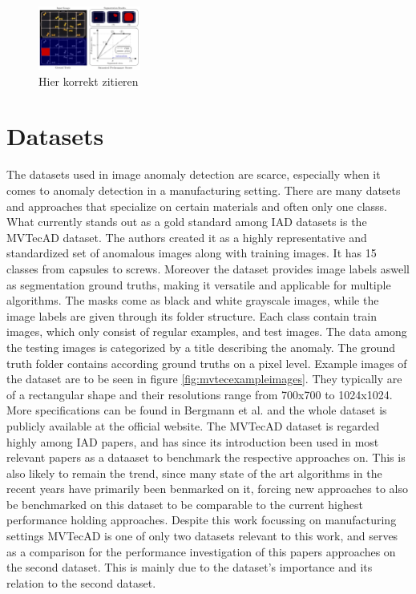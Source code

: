 \begin{figure}[ht]
    \centering
    \includegraphics[width=0.3\textwidth]{figures/spro_vs_pro_bergmann.png}
    \caption{Hier korrekt zitieren}
    \label{fig:sprovspro}
\end{figure}



\section{Datasets}
\label{sec:datasets}
The datasets used in image anomaly detection are scarce, especially when it comes to anomaly detection in a manufacturing setting. There are many datsets and approaches that specialize on certain materials \cite{FabricDataset_Tsang_2016} 
\cite{SteeltubeDataset_Yang_2021} \cite{magnetictiles_Huang_2018}
and often only one classs. What currently stands out as a gold standard among IAD datasets is the MVTecAD \cite{MVTEC_Bergmann_2021} dataset. The authors created it  
as a highly representative and standardized set of anomalous images along with training images. It has 15 classes from capsules to screws. Moreover the dataset provides image labels aswell as segmentation 
ground truths, making it versatile and applicable for multiple algorithms. The masks come as black and white grayscale images, while the image labels are given through its folder structure. 
Each class contain train images, which only consist of regular examples, 
and test images. The data among the testing images is categorized by a title describing the anomaly. The ground truth folder contains 
according ground truths on a pixel level.\newline
Example images of the dataset are to be seen in figure \ref{fig:mvtecexampleimages}. They typically are of a rectangular shape and their resolutions range from 
700x700 to 1024x1024. More specifications can be found in Bergmann et al. \cite{MVTEC_Bergmann_2021} and the whole dataset is publicly available at the official website\cite{mvtecdownload}.\newline
The MVTecAD\cite{MVTEC_Bergmann_2021} dataset is regarded highly among IAD papers, and has since its introduction been used in most relevant papers as a dataaset 
to benchmark the respective approaches on. This is also likely to remain the trend, since many state of the art algorithms in the recent years have primarily been benmarked on it, forcing new approaches 
to also be benchmarked on this dataset to be comparable to the current highest performance holding approaches. Despite this work focussing on manufacturing settings MVTecAD is one of only two datasets relevant to this work, 
and serves as a comparison for the performance investigation of this papers approaches on the second dataset. This is mainly due to the dataset's importance and 
its relation to the second dataset.


